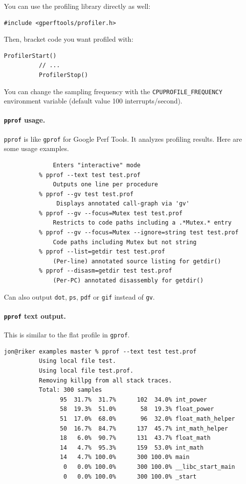 \documentclass[a4paper]{report}
\begin{document}
You can use the profiling library directly as well:
\begin{lstlisting}[basicstyle=\scriptsize]
          #include <gperftools/profiler.h>
\end{lstlisting}
Then, bracket code you want profiled with:
\begin{lstlisting}[basicstyle=\scriptsize]
          ProfilerStart()
          // ...
          ProfilerStop()
\end{lstlisting}
    
You can change the sampling frequency with the {\tt CPUPROFILE\_FREQUENCY} environment variable
(default value 100 interrupts/second).

\paragraph{{\tt pprof} usage.} {\tt pprof} is like {\tt gprof} for Google Perf Tools. It
analyzes profiling results. Here are some usage examples.
  \begin{lstlisting}[basicstyle=\scriptsize]
          % pprof test test.prof
              Enters "interactive" mode
          % pprof --text test test.prof
              Outputs one line per procedure
          % pprof --gv test test.prof
               Displays annotated call-graph via 'gv'
          % pprof --gv --focus=Mutex test test.prof
              Restricts to code paths including a .*Mutex.* entry
          % pprof --gv --focus=Mutex --ignore=string test test.prof
              Code paths including Mutex but not string
          % pprof --list=getdir test test.prof
              (Per-line) annotated source listing for getdir()
          % pprof --disasm=getdir test test.prof
              (Per-PC) annotated disassembly for getdir()
  \end{lstlisting}

Can also output {\tt dot}, {\tt ps}, {\tt pdf} or {\tt gif} instead of {\tt gv}.

\paragraph{{\tt pprof} text output.}
This is similar to the flat profile in {\tt gprof}.

  \begin{lstlisting}[basicstyle=\scriptsize]
          jon@riker examples master % pprof --text test test.prof 
          Using local file test.
          Using local file test.prof.
          Removing killpg from all stack traces.
          Total: 300 samples
                95  31.7%  31.7%      102  34.0% int_power
                58  19.3%  51.0%       58  19.3% float_power
                51  17.0%  68.0%       96  32.0% float_math_helper
                50  16.7%  84.7%      137  45.7% int_math_helper
                18   6.0%  90.7%      131  43.7% float_math
                14   4.7%  95.3%      159  53.0% int_math
                14   4.7% 100.0%      300 100.0% main
                 0   0.0% 100.0%      300 100.0% __libc_start_main
                 0   0.0% 100.0%      300 100.0% _start
  \end{lstlisting}
\end{document}
